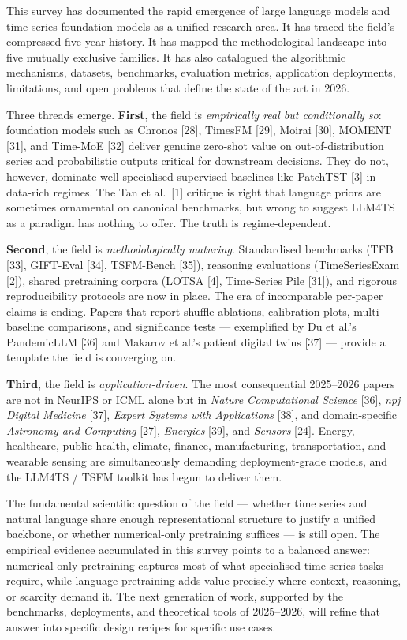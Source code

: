 This survey has documented the rapid emergence of large language models and time-series foundation models as a unified research area. It has traced the field's compressed five-year history. It has mapped the methodological landscape into five mutually exclusive families. It has also catalogued the algorithmic mechanisms, datasets, benchmarks, evaluation metrics, application deployments, limitations, and open problems that define the state of the art in 2026.

Three threads emerge. \textbf{First}, the field is \emph{empirically real but conditionally so}: foundation models such as Chronos {[}28{]}, TimesFM {[}29{]}, Moirai {[}30{]}, MOMENT {[}31{]}, and Time-MoE {[}32{]} deliver genuine zero-shot value on out-of-distribution series and probabilistic outputs critical for downstream decisions. They do not, however, dominate well-specialised supervised baselines like PatchTST {[}3{]} in data-rich regimes. The Tan et al.~{[}1{]} critique is right that language priors are sometimes ornamental on canonical benchmarks, but wrong to suggest LLM4TS as a paradigm has nothing to offer. The truth is regime-dependent.

\textbf{Second}, the field is \emph{methodologically maturing}. Standardised benchmarks (TFB {[}33{]}, GIFT-Eval {[}34{]}, TSFM-Bench {[}35{]}), reasoning evaluations (TimeSeriesExam {[}2{]}), shared pretraining corpora (LOTSA {[}4{]}, Time-Series Pile {[}31{]}), and rigorous reproducibility protocols are now in place. The era of incomparable per-paper claims is ending. Papers that report shuffle ablations, calibration plots, multi-baseline comparisons, and significance tests --- exemplified by Du et al.'s PandemicLLM {[}36{]} and Makarov et al.'s patient digital twins {[}37{]} --- provide a template the field is converging on.

\textbf{Third}, the field is \emph{application-driven}. The most consequential 2025--2026 papers are not in NeurIPS or ICML alone but in \emph{Nature Computational Science} {[}36{]}, \emph{npj Digital Medicine} {[}37{]}, \emph{Expert Systems with Applications} {[}38{]}, and domain-specific \emph{Astronomy and Computing} {[}27{]}, \emph{Energies} {[}39{]}, and \emph{Sensors} {[}24{]}. Energy, healthcare, public health, climate, finance, manufacturing, transportation, and wearable sensing are simultaneously demanding deployment-grade models, and the LLM4TS / TSFM toolkit has begun to deliver them.

The fundamental scientific question of the field --- whether time series and natural language share enough representational structure to justify a unified backbone, or whether numerical-only pretraining suffices --- is still open. The empirical evidence accumulated in this survey points to a balanced answer: numerical-only pretraining captures most of what specialised time-series tasks require, while language pretraining adds value precisely where context, reasoning, or scarcity demand it. The next generation of work, supported by the benchmarks, deployments, and theoretical tools of 2025--2026, will refine that answer into specific design recipes for specific use cases.

